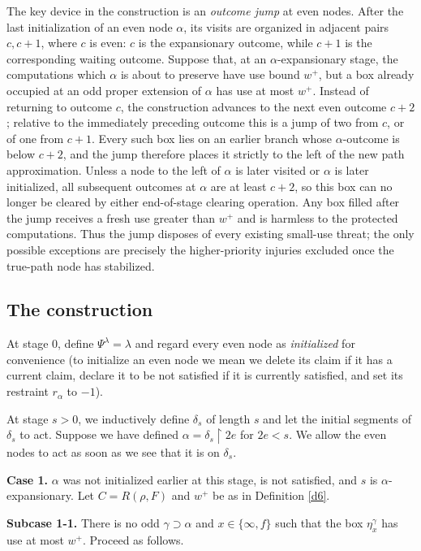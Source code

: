\documentclass[11pt]{amsart}
\begin{document}
The key device in the construction is an \emph{outcome jump} at even nodes.
After the last initialization of an even node $\alpha$, its visits are
organized in adjacent pairs $c,c+1$, where $c$ is even: $c$ is the
expansionary outcome, while $c+1$ is the corresponding waiting outcome.
Suppose that, at an $\alpha$-expansionary stage, the computations which
$\alpha$ is about to preserve have use bound $w^+$, but a box already
occupied at an odd proper extension of $\alpha$ has use at most $w^+$.
Instead of returning to outcome $c$, the construction advances to the next
even outcome $c+2$; relative to the immediately preceding outcome this is a
jump of two from $c$, or of one from $c+1$. Every such box lies on an earlier
branch whose $\alpha$-outcome is below $c+2$, and the jump therefore places it
strictly to the left of the new path approximation. Unless a node to the left
of $\alpha$ is later visited or $\alpha$ is later initialized, all subsequent
outcomes at $\alpha$ are at least $c+2$, so this box can no longer be cleared
by either end-of-stage clearing operation. Any box filled after the jump
receives a fresh use greater than $w^+$ and is harmless to the protected
computations. Thus the jump disposes of every existing small-use threat; the
only possible exceptions are precisely the higher-priority injuries excluded
once the true-path node has stabilized.

\subsection{The construction}
At stage $0$, define $\Psi^\lambda=\lambda$ and regard every even node as
\emph{initialized} for convenience (to
initialize an even node we mean we delete its claim if it has a current claim,
declare it to be not satisfied if it is currently satisfied, and set its restraint $r_\alpha$ to $-1$). 

At stage $s>0$, we inductively define $\delta_s$ of length $s$
and let the initial segments of $\delta_s$ to act. Suppose we have defined
$\alpha = \delta_s \upharpoonright 2 e$ for $2 e < s$. We allow the even nodes to act as soon as we see that it is on
$\delta_s$.

\textbf{Case 1.}  $\alpha$ was not initialized earlier at this stage, is not
satisfied, and $s$ is $\alpha$-expansionary.  Let 
$C=R(\rho,F)$ and $w^+$ be as in Definition \ref{d6}.

\textbf{Subcase 1-1.}  There is no odd $\gamma\supset\alpha$ and
$x\in\{\infty,f\}$ such that the box $\eta_x^\gamma$ has use at most $w^+$.
Proceed as follows.
\end{document}
